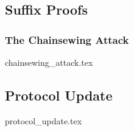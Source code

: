 \subsection{Suffix Proofs}

\subsubsection{The Chainsewing Attack}
{chainsewing_attack.tex}

\subsection{Protocol Update}
{protocol_update.tex}
